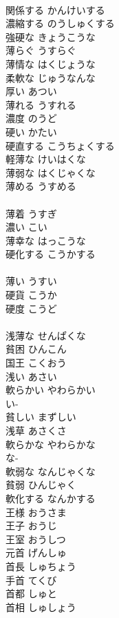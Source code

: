 \documentclass[8pt]{extreport}
\begin{document}
\begin{CJK}{UTF8}{min}
\\	関係する	かんけいする	
\\	濃縮する	のうしゅくする	
\\	強硬な	きょうこうな	
\\	薄らぐ	うすらぐ	
\\	薄情な	はくじょうな	
\\	柔軟な	じゅうなんな	
\\	厚い	あつい	
\\	薄れる	うすれる	
\\	濃度	のうど	
\\	硬い	かたい	
\\	硬直する	こうちょくする	
\\	軽薄な	けいはくな	
\\	薄弱な	はくじゃくな	
\\	薄める	うすめる	
\\	[和語]
\\	薄着	うすぎ	
\\	濃い	こい	
\\	薄幸な	はっこうな	
\\	硬化する	こうかする	
\\	[漢語]
\\	薄い	うすい	
\\	硬貨	こうか	
\\	硬度	こうど	
\\	[漢語]
\\	浅薄な	せんぱくな	
\\	貧困	ひんこん	
\\	国王	こくおう	
\\	浅い	あさい	
\\	軟らかい	やわらかい	
\\	い-
\\	貧しい	まずしい	
\\	浅草	あさくさ	
\\	軟らかな	やわらかな	
\\	な-
\\	軟弱な	なんじゃくな	
\\	貧弱	ひんじゃく	
\\	軟化する	なんかする	
\\	王様	おうさま	
\\	王子	おうじ	
\\	王室	おうしつ	
\\	元首	げんしゅ	
\\	首長	しゅちょう	
\\	手首	てくび	
\\	首都	しゅと	
\\	首相	しゅしょう	

\end{CJK}
\end{document}
